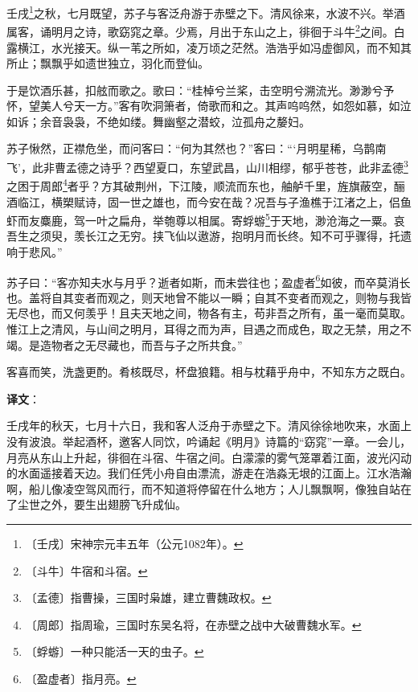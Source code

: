 \documentclass[12pt,UTF-8,openany]{ctexbook}
\begin{document}
\begin{normalsize}
    
    壬戌\footnote{〔壬戌〕宋神宗元丰五年（公元1082年）。}之秋，七月既望，苏子与客泛舟游于赤壁之下。清风徐来，水波不兴。举酒属客，诵明月之诗，歌窈窕之章。少焉，月出于东山之上，徘徊于斗牛\footnote{〔斗牛〕牛宿和斗宿。}之间。白露横江，水光接天。纵一苇之所如，凌万顷之茫然。浩浩乎如冯虚御风，而不知其所止；飘飘乎如遗世独立，羽化而登仙。
    
    于是饮酒乐甚，扣舷而歌之。歌曰：“桂棹兮兰桨，击空明兮溯流光。渺渺兮予怀，望美人兮天一方。”客有吹洞箫者，倚歌而和之。其声呜呜然，如怨如慕，如泣如诉；余音袅袅，不绝如缕。舞幽壑之潜蛟，泣孤舟之嫠妇。
    
    苏子愀然，正襟危坐，而问客曰：“何为其然也？”客曰：“‘月明星稀，乌鹊南飞’，此非曹孟德之诗乎？西望夏口，东望武昌，山川相缪，郁乎苍苍，此非孟德\footnote{〔孟德〕指曹操，三国时枭雄，建立曹魏政权。}之困于周郎\footnote{〔周郎〕指周瑜，三国时东吴名将，在赤壁之战中大破曹魏水军。}者乎？方其破荆州，下江陵，顺流而东也，舳舻千里，旌旗蔽空，酾酒临江，横槊赋诗，固一世之雄也，而今安在哉？况吾与子渔樵于江渚之上，侣鱼虾而友麋鹿，驾一叶之扁舟，举匏尊以相属。寄蜉蝣\footnote{〔蜉蝣〕一种只能活一天的虫子。}于天地，渺沧海之一粟。哀吾生之须臾，羡长江之无穷。挟飞仙以遨游，抱明月而长终。知不可乎骤得，托遗响于悲风。”
    
    苏子曰：“客亦知夫水与月乎？逝者如斯，而未尝往也；盈虚者\footnote{〔盈虚者〕指月亮。}如彼，而卒莫消长也。盖将自其变者而观之，则天地曾不能以一瞬；自其不变者而观之，则物与我皆无尽也，而又何羡乎！且夫天地之间，物各有主，苟非吾之所有，虽一毫而莫取。惟江上之清风，与山间之明月，耳得之而为声，目遇之而成色，取之无禁，用之不竭。是造物者之无尽藏也，而吾与子之所共食。”
    
    客喜而笑，洗盏更酌。肴核既尽，杯盘狼籍。相与枕藉乎舟中，不知东方之既白。
\end{normalsize}


\newpage

\textbf{译文}：

\vspace{1em}

\begin{normalsize}
    
    壬戌年的秋天，七月十六日，我和客人泛舟于赤壁之下。清风徐徐地吹来，水面上没有波浪。举起酒杯，邀客人同饮，吟诵起《明月》诗篇的“窈窕”一章。一会儿，月亮从东山上升起，徘徊在斗宿、牛宿之间。白濛濛的雾气笼罩着江面，波光闪动的水面遥接着天边。我们任凭小舟自由漂流，游走在浩淼无垠的江面上。江水浩瀚啊，船儿像凌空驾风而行，而不知道将停留在什么地方；人儿飘飘啊，像独自站在了尘世之外，要生出翅膀飞升成仙。
    
    
    
    
    
    
    
    
    
\end{normalsize}
\end{document}
